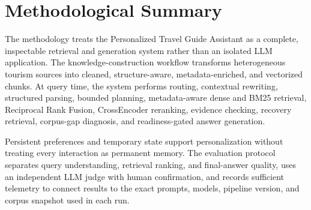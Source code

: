 \section{Methodological Summary}

The methodology treats the Personalized Travel Guide Assistant as a complete,
inspectable retrieval and generation system rather than an isolated LLM
application. The knowledge-construction workflow transforms heterogeneous
tourism sources into cleaned, structure-aware, metadata-enriched, and
vectorized chunks. At query time, the system performs routing, contextual
rewriting, structured parsing, bounded planning, metadata-aware dense and BM25
retrieval, Reciprocal Rank Fusion, CrossEncoder reranking, evidence checking,
recovery retrieval, corpus-gap diagnosis, and readiness-gated answer
generation.

Persistent preferences and temporary state support personalization without
treating every interaction as permanent memory. The evaluation protocol
separates query understanding, retrieval ranking, and final-answer quality,
uses an independent LLM judge with human confirmation, and records sufficient
telemetry to connect results to the exact prompts, models, pipeline version,
and corpus snapshot used in each run.
